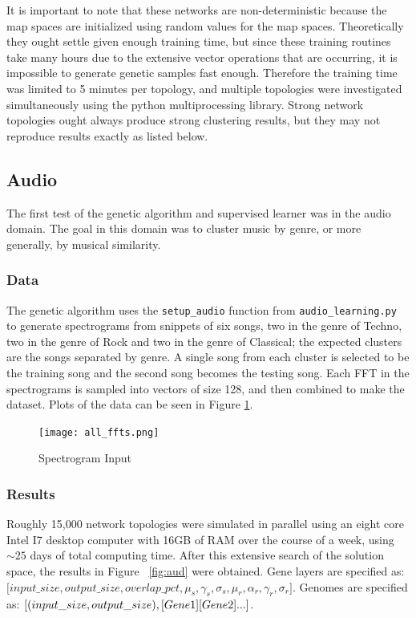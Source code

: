 \documentclass[12pt,a4paper]{article}
\begin{document}
It is important to note that these networks are non-deterministic because the map spaces are initialized using random values for the map spaces.  Theoretically they ought settle given enough training time, but since these training routines take many hours due to the extensive vector operations that are occurring, it is impossible to generate genetic samples fast enough.  Therefore the training time was limited to 5 minutes per topology, and multiple topologies were investigated simultaneously using the python multiprocessing library. Strong network topologies ought always produce strong clustering results, but they may not reproduce results exactly as listed below.

\subsection{Audio}
The first test of the genetic algorithm and supervised learner was in the audio domain.  The goal in this domain was to cluster music by genre, or more generally, by musical similarity. 

\subsubsection{Data}
The genetic algorithm uses the \texttt{setup\_audio} function from \texttt{audio\_learning.py} to generate spectrograms from snippets of six songs, two in the genre of Techno, two in the genre of Rock and two in the genre of Classical; the expected clusters are the songs separated by genre. A single song from each cluster is selected to be the training song and the second song becomes the testing song.  Each FFT in the spectrograms is sampled into vectors of size 128, and then combined to make the dataset.  Plots of the data can be seen in Figure \ref{fig:ffts}.
\begin{figure}[H]
\caption{Spectrogram Input}
\centering
\texttt{[image: all\_ffts.png]}
\label{fig:ffts}
\end{figure}

\subsubsection{Results}
Roughly 15,000 network topologies were simulated in parallel using an eight core Intel I7 desktop computer with 16GB of RAM over the course of a week, using $\sim25$ days of total computing time.  After this extensive search of the solution space, the results in Figure ~\ref{fig:aud} were obtained. Gene layers are specified as:
\newline
$\lbrack input\_size, output\_size, overlap\_pct, \mu_s, \gamma_s, \sigma_s, \mu_r, \alpha_r, \gamma_r, \sigma_r \rbrack$.
\newline
Genomes are specified as:
\newline
$\lbrack (input\_size, output\_size),\\
 \lbrack Gene 1\rbrack \\
 \lbrack Gene 2\rbrack ...\rbrack$.
\newline
\end{document}
